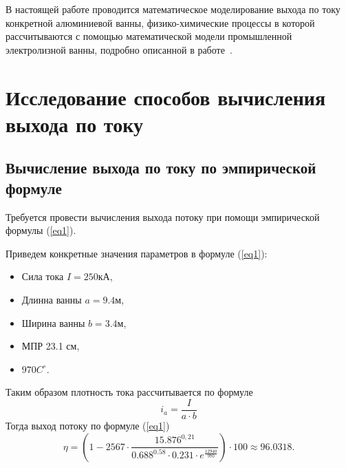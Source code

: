 \documentclass{article}
\begin{document}
В настоящей работе проводится математическое моделирование выхода по току конкретной алюминиевой ванны, физико-химические процессы в которой рассчитываются с помощью математической модели промышленной электролизной ванны, подробно описанной в работе~\cite{litlink:kalmykov}.

\section{Исследование способов вычисления выхода по току}

\subsection{Вычисление выхода по току по эмпирической формуле}
Требуется провести вычисления выхода потоку при помощи эмпирической формулы (\ref{eq1}).

Приведем конкретные значения параметров в формуле (\ref{eq1}):
\begin{itemize}
\item Сила тока $I=250 $кА,
\item Длинна ванны $a=9.4$м,
\item Ширина ванны $b=3.4$м,
\item МПР 23.1 см,
\item $970 C^{\circ}$.
\end{itemize}
Таким образом плотность тока рассчитывается по формуле
\begin{equation}
i_a = \frac{I}{a \cdot b}
\end{equation}
Тогда выход потоку по формуле (\ref{eq1})
\begin{equation}
\eta=(1-2567 \cdot \frac{15.876^{0,21}}{0.688^{0.58} \cdot 0.231 \cdot e^{\frac{12940}{970}}}) \cdot 100 \approx 96.0318.
\end{equation}
\end{document}
